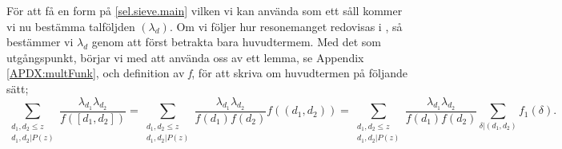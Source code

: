 För att få en form på \eqref{sel.sieve.main} vilken vi kan använda som ett såll kommer vi nu bestämma talföljden \((\lambda_d)\). 
Om vi följer hur resonemanget redovisas i \cite{cojocarumurty}, så bestämmer vi \(\lambda_d\) genom att först betrakta bara huvudtermem. 
 Med det som utgångspunkt, börjar vi med att använda oss av ett lemma, se Appendix \ref{APDX:multFunk}, och definition av \textit{f}, för att skriva om huvudtermen på följande sätt;
\begin{equation}
    \sum_{\substack{d_1,d_2\leq z\\d_1,d_2|P(z)}}\frac{\lambda_{d_1}\lambda_{d_2}}{f([d_1,d_2])} = \sum_{\substack{d_1,d_2\leq z\\d_1,d_2|P(z)}}\frac{\lambda_{d_1}\lambda_{d_2}}{f(d_1)f(d_2)}f((d_1,d_2)) = \sum_{\substack{d_1,d_2\leq z\\d_1,d_2|P(z)}}\frac{\lambda_{d_1}\lambda_{d_2}}{f(d_1)f(d_2)}\sum_{\delta|(d_1,d_2)}f_1(\delta).\label{sel.sieve.exchange}
\end{equation}

